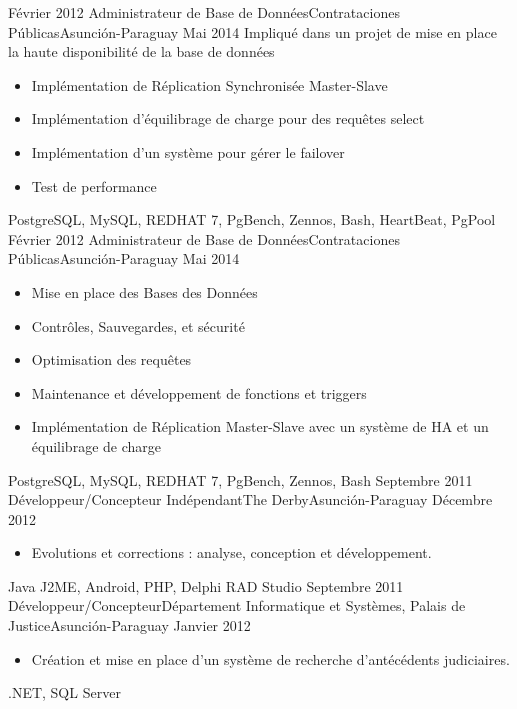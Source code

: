 \begin{experiences}
  \emptySeparator
  \projectexperiences
    {Février 2012}   {Administrateur de Base de Données}{Contrataciones Públicas}{Asunción-Paraguay}
    {Mai 2014}      {
                      Impliqué dans un projet de mise en place la haute disponibilité de la base de données
                    }
                    {
                      \begin{itemize}
                        \item Implémentation de Réplication Synchronisée Master-Slave
                        \item Implémentation d'équilibrage de charge pour des requêtes select
                        \item Implémentation d'un système pour gérer le failover
                        \item  Test de performance
                      \end{itemize}
                    }
                {PostgreSQL, MySQL, REDHAT 7, PgBench, Zennos, Bash, HeartBeat, PgPool}
  \emptySeparator
  \experience
    {Février 2012}   {Administrateur de Base de Données}{Contrataciones Públicas}{Asunción-Paraguay}
    {Mai 2014} {
                      \begin{itemize}
                        \item Mise en place des Bases des Données
                        \item Contrôles, Sauvegardes, et sécurité
                        \item Optimisation des requêtes
                        \item Maintenance et développement de fonctions et triggers
                        \item Implémentation de Réplication Master-Slave avec un système de HA et un équilibrage de charge
                      \end{itemize}
				}
                {PostgreSQL, MySQL, REDHAT 7, PgBench, Zennos, Bash}
  \emptySeparator
  \experience
    {Septembre 2011}   {Développeur/Concepteur Indépendant}{The Derby}{Asunción-Paraguay}
    {Décembre 2012} {
                      \begin{itemize}
                        \item Evolutions et corrections : analyse, conception et développement.
                      \end{itemize}
				}
                {Java J2ME, Android, PHP, Delphi RAD Studio}
  \emptySeparator
  \experience
    {Septembre 2011}   {Développeur/Concepteur}{Département Informatique et Systèmes, Palais de Justice}{Asunción-Paraguay}
    {Janvier 2012} {
                      \begin{itemize}
                        \item Création et mise en place d’un système de recherche d’antécédents judiciaires.
                      \end{itemize}
				}
                {.NET, SQL Server}
  \emptySeparator
\end{experiences}
